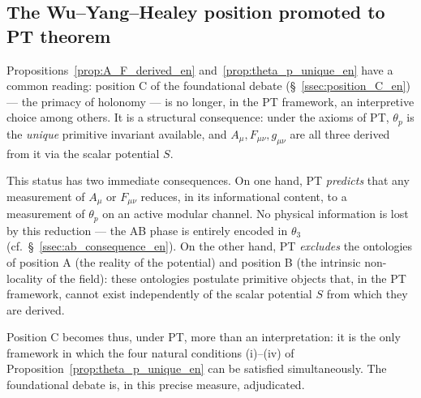 \subsection{The Wu--Yang--Healey position promoted to PT theorem}
\label{ssec:wu_yang_promoted_en}

Propositions~\ref{prop:A_F_derived_en}
and~\ref{prop:theta_p_unique_en} have a common reading: position
C of the foundational debate
(\S~\ref{ssec:position_C_en}) --- the primacy of holonomy --- is
no longer, in the PT framework, an interpretive choice among
others. It is a structural consequence: under the axioms of PT,
$\theta_p$ is the \emph{unique} primitive invariant available,
and $A_\mu, F_{\mu\nu}, g_{\mu\nu}$ are all three derived from
it via the scalar potential $S$.

This status has two immediate consequences. On one hand, PT
\emph{predicts} that any measurement of $A_\mu$ or $F_{\mu\nu}$
reduces, in its informational content, to a measurement of
$\theta_p$ on an active modular channel. No physical information
is lost by this reduction --- the AB phase is entirely encoded
in $\theta_3$ (cf.~\S~\ref{ssec:ab_consequence_en}). On the other
hand, PT \emph{excludes} the ontologies of position A (the reality
of the potential) and position B (the intrinsic non-locality of
the field): these ontologies postulate primitive objects that, in
the PT framework, cannot exist independently of the scalar
potential $S$ from which they are derived.

Position C becomes thus, under PT, more than an interpretation:
it is the only framework in which the four natural conditions
(i)--(iv) of Proposition~\ref{prop:theta_p_unique_en} can be
satisfied simultaneously. The foundational debate is, in this
precise measure, adjudicated.
